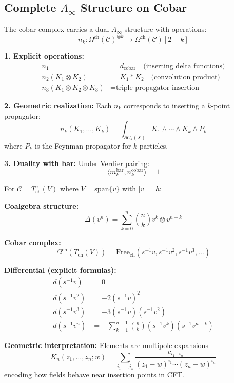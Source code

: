 \subsection{Complete $A_\infty$ Structure on Cobar}

\begin{theorem}
The cobar complex carries a dual $A_\infty$ structure with operations:
$$n_k: \Omega^{\text{ch}}(\mathcal{C})^{\otimes k} \to \Omega^{\text{ch}}(\mathcal{C})[2-k]$$

\textbf{1. Explicit operations:}
\begin{align}
n_1 &= d_{\text{cobar}} \quad \text{(inserting delta functions)} \\
n_2(K_1 \otimes K_2) &= K_1 * K_2 \quad \text{(convolution product)} \\
n_3(K_1 \otimes K_2 \otimes K_3) &= \text{triple propagator insertion}
\end{align}

\textbf{2. Geometric realization:} Each $n_k$ corresponds to inserting a $k$-point propagator:
$$n_k(K_1, \ldots, K_k) = \int_{\partial C_k(X)} K_1 \wedge \cdots \wedge K_k \wedge P_k$$
where $P_k$ is the Feynman propagator for $k$ particles.

\textbf{3. Duality with bar:} Under Verdier pairing:
$$\langle m_k^{\text{bar}}, n_k^{\text{cobar}} \rangle = 1$$
\end{theorem}

\begin{example}
For $\mathcal{C} = T^c_{\text{ch}}(V)$ where $V = \text{span}\{v\}$ with $|v| = h$:

\textbf{Coalgebra structure:}
$$\Delta(v^n) = \sum_{k=0}^n \binom{n}{k} v^k \otimes v^{n-k}$$

\textbf{Cobar complex:}
$$\Omega^{\text{ch}}(T^c_{\text{ch}}(V)) = \text{Free}_{\text{ch}}(s^{-1}v, s^{-1}v^2, s^{-1}v^3, \ldots)$$

\textbf{Differential (explicit formulas):}
\begin{align}
d(s^{-1}v) &= 0 \\
d(s^{-1}v^2) &= -2(s^{-1}v)^2 \\
d(s^{-1}v^3) &= -3(s^{-1}v)(s^{-1}v^2) \\
d(s^{-1}v^n) &= -\sum_{k=1}^{n-1} \binom{n}{k}(s^{-1}v^k)(s^{-1}v^{n-k})
\end{align}

\textbf{Geometric interpretation:} Elements are multipole expansions
$$K_n(z_1, \ldots, z_n; w) = \sum_{i_1, \ldots, i_n} \frac{c_{i_1\ldots i_n}}{(z_1 - w)^{i_1} \cdots (z_n - w)^{i_n}}$$
encoding how fields behave near insertion points in CFT.
\end{example}

